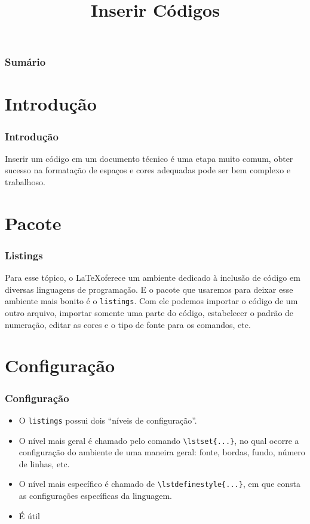 \documentclass[brazilian]{beamer}
\title{Inserir Códigos}
\begin{document}
\frame{\titlepage}

\begin{frame}
    \frametitle{Sumário}
    \tableofcontents
\end{frame}
\section{Introdução}

\begin{frame}
    \frametitle{Introdução}
Inserir um código em um documento técnico é uma etapa muito comum, obter sucesso na formatação de espaços e cores adequadas pode ser bem complexo e trabalhoso. 
\end{frame}

\section{Pacote}
\begin{frame}
    \frametitle{Listings}
Para esse tópico, o \LaTeX oferece um ambiente dedicado à inclusão de código em diversas linguagens de programação. E o pacote que usaremos para deixar esse ambiente mais bonito é o \texttt{listings}. Com ele podemos importar o código de um outro arquivo, importar somente uma parte do código, estabelecer o padrão de numeração, editar as cores e o tipo de fonte para os comandos, etc.
\end{frame}

\section{Configuração}
\begin{frame}[fragile]
    \frametitle{Configuração}

    \begin{itemize}
        \item O \texttt{listings} possui dois ``níveis de configuração''.
        \item O nível mais geral é chamado pelo comando \lstinline[style=myStyleLatex]!\lstset{...}!, no qual ocorre a configuração do ambiente de uma maneira geral: fonte, bordas, fundo, número de linhas, etc.
        \item O nível mais específico é chamado de \lstinline[style=myStyleLatex]!\lstdefinestyle{...}!, em que consta as configurações específicas da linguagem.
        \item É útil 
    \end{itemize}

\end{frame}
\end{document}
